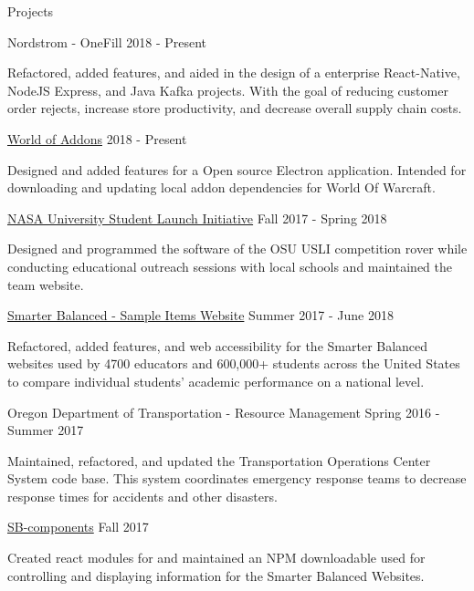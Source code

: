 \documentclass{resume} %
\begin{document}
\begin{rSection}{Projects}
  \begin{rSubsection} {Nordstrom - OneFill} {2018 - Present} {} {}
  \item Refactored, added features, and aided in the design of a enterprise React-Native, NodeJS Express, and Java Kafka projects. With the goal of reducing customer order rejects, increase store productivity, and decrease overall supply chain costs.
  \end{rSubsection}

  \begin{rSubsection} {\href{https://github.com/WorldofAddons/worldofaddons}{World of Addons}} {2018 - Present} {} {}
  \item Designed and added features for a Open source Electron application. Intended for downloading and updating local addon dependencies for World Of Warcraft.
  \end{rSubsection}
  
  \begin{rSubsection} {\href{http://osu-usli.com}{NASA University Student Launch Initiative}} {Fall 2017 - Spring 2018} {} {}
  \item Designed and programmed the software of the OSU USLI competition rover while conducting educational outreach sessions with local schools and maintained the team website.
  \end{rSubsection}

  \begin{rSubsection} {\href{http://sampleitems.smarterbalanced.org}{Smarter Balanced - Sample Items Website}} {Summer 2017 - June 2018} {} {}
  \item Refactored, added features, and web accessibility for the Smarter Balanced websites used by 4700 educators and 600,000+ students across the United States to compare individual students' academic performance on a national level.
  \end{rSubsection}

  \begin{rSubsection} {Oregon Department of Transportation - Resource Management} {Spring 2016 - Summer 2017} {} {}
  \item Maintained, refactored, and updated the Transportation Operations Center System code base. This system coordinates emergency response teams to decrease response times for accidents and other disasters.
  \end{rSubsection}

  \begin{rSubsection} {\href{https://www.npmjs.com/package/@osu-cass/sb-components}{SB-components}} {Fall 2017} {} {}
  \item Created react modules for and maintained an NPM downloadable used for controlling and displaying information for the Smarter Balanced Websites.
  \end{rSubsection}

\end{rSection}
\end{document}

